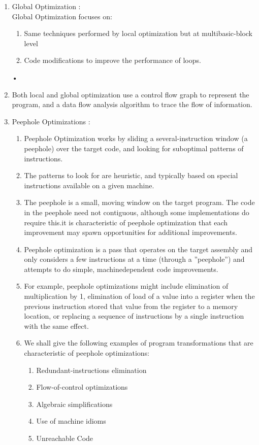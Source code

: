 \documentclass[11pt]{article}
\begin{document}
	\begin{enumerate}
		\item Global Optimization :\\
		Global Optimization focuses on:\\
		\begin{enumerate}
			\item Same techniques performed by local optimization but at multibasic-block level
			\item Code modifications to improve the performance of loops.
		\end{enumerate}•
		
		\item Both local and global optimization use a control flow graph to represent the program, and a data flow analysis algorithm to trace the flow of information.
		\item Peephole Optimizations :
		\begin{enumerate}
			\item Peephole Optimization works by sliding a several-instruction window (a peephole) over the target code, and looking for suboptimal patterns of instructions.
			\item The patterns to look for are heuristic, and typically based on special instructions available on a given machine.
			\item The peephole is a small, moving window on the target program. The code in the peephole need not contiguous, although some implementations do require this.it is characteristic of peephole optimization that each improvement may spawn opportunities for additional improvements.
			\item Peephole optimization is a pass that operates on the target assembly and only considers a few instructions at a time (through a ”peephole”) and attempts to do simple, machinedependent code improvements.
			\item For example, peephole optimizations might include elimination of multiplication by 1, elimination of load of a value into a register when the previous instruction stored that value from the register to a memory location, or replacing a sequence of instructions by a single instruction with the same effect.
			\item We shall give the following examples of program transformations that are characteristic of peephole optimizations:
			\begin{enumerate}
				\item 	Redundant-instructions elimination
				\item Flow-of-control optimizations
				\item Algebraic simplifications
				\item Use of machine idioms
				\item Unreachable Code
				

\end{enumerate}
\end{enumerate}
\end{enumerate}
\end{document}
